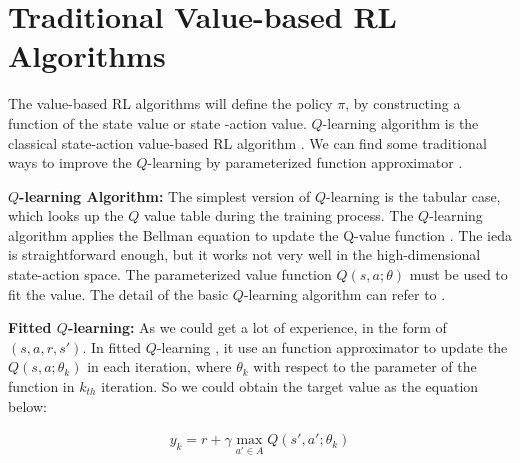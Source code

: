 \documentclass{article}
\begin{document}
%
\section{Traditional Value-based RL Algorithms}
\label{sec:Traditional Value-based RL Algorithms}
The value-based RL algorithms will define the policy $\pi$, by constructing a function of the state value or state -action value.  $Q$-learning algorithm \citep{watkins1992q} is the classical state-action value-based RL algorithm . We can find some traditional ways to improve the $Q$-learning by parameterized function approximator \citep{gordon1996stable}.





{\bf $Q$-learning Algorithm:}
The simplest version of $Q$-learning is the tabular case, which looks up the $Q$ value table during the training process.  The  $Q$-learning algorithm applies the Bellman equation to update the Q-value function \citep{bellman1962dynamic}. The ieda is straightforward enough, but it works not very well in the high-dimensional state-action space. The parameterized value function  $Q(s, a; \theta)$ must be used to fit the value. The detail of the basic $Q$-learning algorithm can refer to \citep{sutton2018reinforcement}.

{\bf Fitted $Q$-learning:}
As we could get a lot of experience, in the form of  $(s,a,r,s')$. In fitted $Q$-learning \citep{gordon1996stable}, it use an function approximator to update the  $Q(s, a; \theta_k )$ in each iteration, where  $\theta_k$ with respect to the parameter of  the function  in $k_{th}$ iteration. So we could obtain the target value as the equation below:

\begin{align}
y_k = r +\gamma \operatorname*{max}_{a' \in  A} Q(s',a';\theta_{k})
\end{align}
\end{document}
